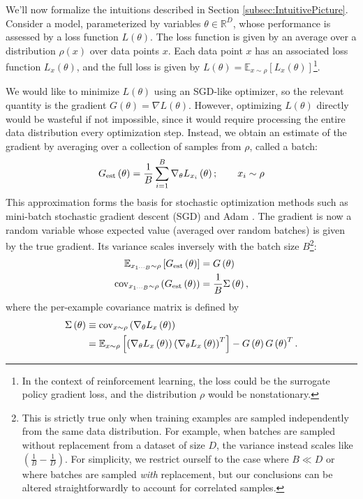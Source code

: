 \documentclass[english]{article}
\begin{document}
\label{sec:gradients}

We'll now formalize the intuitions described in Section \ref{subsec:IntuitivePicture}. Consider a model, parameterized by variables $\theta\in\mathbb{R}^{D}$, whose performance is assessed by a loss function $L\left(\theta\right)$. The loss function is given by an average over a distribution $\rho\left(x\right)$ over data points $x$. Each data point $x$ has an associated loss function $L_{x}\left(\theta\right)$, and the full loss is given by $L\left(\theta\right)=\mathbb{E}_{x\sim\rho}\left[L_{x}\left(\theta\right)\right]$\footnote{In the context of reinforcement learning, the loss could be the surrogate policy gradient loss, and the distribution $\rho$ would be nonstationary.}.

We would like to minimize $L\left(\theta\right)$ using an SGD-like optimizer, so the relevant quantity is the gradient $G\left(\theta\right)=\nabla L\left(\theta\right)$. However, optimizing $L\left(\theta\right)$ directly would be wasteful if not impossible, since it would require processing the entire data distribution every optimization step. Instead, we obtain an estimate of the gradient by averaging over a collection of samples from $\rho$, called a batch:
\begin{equation}
G_{{\rm est}}\left(\theta\right)=\frac{1}{B}\sum_{i=1}^{B}\nabla_{\theta}L_{x_{i}}\left(\theta\right);\qquad x_{i}\sim\rho
\end{equation}
This approximation forms the basis for stochastic optimization methods such as mini-batch stochastic gradient descent (SGD) and Adam \cite{kingma2014adam}. The gradient is now a random variable whose expected value (averaged over random batches) is given by the true gradient. Its variance scales inversely with the batch size $B$\footnote{This is strictly true only when training examples are sampled independently from the same data distribution. For example, when batches are sampled without replacement from a dataset of size $D$, the variance instead scales like $\left(\frac{1}{B}-\frac{1}{D}\right)$. For simplicity, we restrict ourself to the case where $B\ll D$ or where batches are sampled \emph{with} replacement, but our conclusions can be altered straightforwardly to account for correlated samples.}:
\begin{align}
\mathbb{E}_{x_{1\cdots B}\sim\rho}\left[G_{{\rm est}}\left(\theta\right)\right] & =G\left(\theta\right)\nonumber \\
{\rm cov}_{x_{1\cdots B}\sim\rho}\left(G_{{\rm est}}\left(\theta\right)\right) & =\frac{1}{B}\Sigma\left(\theta\right),\label{eq:gradient-estimate-variance}
\end{align}
where the per-example covariance matrix is defined by
\begin{align}
\Sigma\left(\theta\right) & \equiv{\rm cov}_{x\sim\rho}\left(\nabla_{\theta}L_{x}\left(\theta\right)\right)\nonumber \\
 & =\mathbb{E}_{x\sim\rho}\left[\left(\nabla_{\theta}L_{x}\left(\theta\right)\right)\left(\nabla_{\theta}L_{x}\left(\theta\right)\right)^{T}\right]-G\left(\theta\right)G\left(\theta\right)^{T}.\label{eq:per-sample-gradient-covariance}
\end{align}
\end{document}
